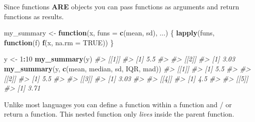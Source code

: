 \documentclass[]{book}
\newenvironment{Shaded}{\begin{snugshade}}{\end{snugshade}}
\newcommand{\KeywordTok}[1]{\textcolor[rgb]{0.13,0.29,0.53}{\textbf{#1}}}
\newcommand{\DataTypeTok}[1]{\textcolor[rgb]{0.13,0.29,0.53}{#1}}
\newcommand{\DecValTok}[1]{\textcolor[rgb]{0.00,0.00,0.81}{#1}}
\newcommand{\StringTok}[1]{\textcolor[rgb]{0.31,0.60,0.02}{#1}}
\newcommand{\CommentTok}[1]{\textcolor[rgb]{0.56,0.35,0.01}{\textit{#1}}}
\newcommand{\OtherTok}[1]{\textcolor[rgb]{0.56,0.35,0.01}{#1}}
\newcommand{\ControlFlowTok}[1]{\textcolor[rgb]{0.13,0.29,0.53}{\textbf{#1}}}
\newcommand{\OperatorTok}[1]{\textcolor[rgb]{0.81,0.36,0.00}{\textbf{#1}}}
\newcommand{\NormalTok}[1]{#1}
\begin{document}
Since functions \textbf{ARE} objects you can pass functions as arguments
and return functions as results.

\begin{Shaded}
\begin{Highlighting}[]
\NormalTok{my_summary <-}\StringTok{ }\ControlFlowTok{function}\NormalTok{(x, }\DataTypeTok{funs =} \KeywordTok{c}\NormalTok{(mean, sd), ...) \{}
  \KeywordTok{lapply}\NormalTok{(funs, }\ControlFlowTok{function}\NormalTok{(f) }\KeywordTok{f}\NormalTok{(x, }\DataTypeTok{na.rm =} \OtherTok{TRUE}\NormalTok{))}
\NormalTok{\}}

\NormalTok{y <-}\StringTok{ }\DecValTok{1}\OperatorTok{:}\DecValTok{10}
\KeywordTok{my_summary}\NormalTok{(y)}
\CommentTok{#> [[1]]}
\CommentTok{#> [1] 5.5}
\CommentTok{#> }
\CommentTok{#> [[2]]}
\CommentTok{#> [1] 3.03}
\KeywordTok{my_summary}\NormalTok{(y, }\KeywordTok{c}\NormalTok{(mean, median, sd, IQR, mad))}
\CommentTok{#> [[1]]}
\CommentTok{#> [1] 5.5}
\CommentTok{#> }
\CommentTok{#> [[2]]}
\CommentTok{#> [1] 5.5}
\CommentTok{#> }
\CommentTok{#> [[3]]}
\CommentTok{#> [1] 3.03}
\CommentTok{#> }
\CommentTok{#> [[4]]}
\CommentTok{#> [1] 4.5}
\CommentTok{#> }
\CommentTok{#> [[5]]}
\CommentTok{#> [1] 3.71}
\end{Highlighting}
\end{Shaded}

Unlike most languages you can define a function within a function and /
or return a function. This nested function only \emph{lives} inside the
parent function.
\end{document}
